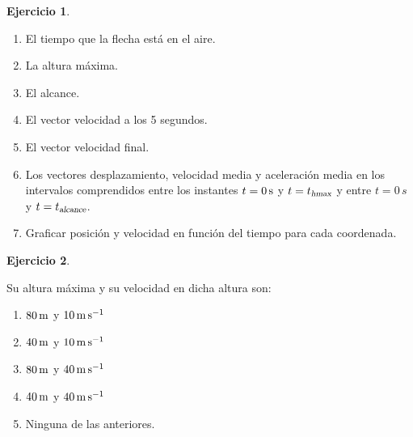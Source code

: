 \documentclass[a4paper,12pt,twoside]{book}
\newtheorem{ejercicio}{{Ejercicio}}[chapter]
\begin{document}
\begin{mdframed}[style=ejercicio-facil]
    \begin{ejercicio}
    \end{ejercicio}
    \begin{enumerate}
        \item El tiempo que la flecha está en el aire. 
        \item La altura máxima.
        \item El alcance.
        \item El vector velocidad a los 5 segundos.
        \item El vector velocidad final.
        \item Los vectores desplazamiento, velocidad media y aceleración media en los intervalos comprendidos entre los instantes $t=0 \, \si{\second}$ y $t = {{t}_\textsl{{hmax}}}$ y entre $t = 0 \, s$ y
        $t = {{t}_\textsl{{alcance}}}$.
        \item Graficar posición y velocidad en función del tiempo para cada coordenada. 
    \end{enumerate}
\end{mdframed}

\begin{mdframed}[style=ejercicio-facil]
    \begin{ejercicio}
    \end{ejercicio}
    Su altura máxima y su velocidad en dicha altura son:
    \begin{enumerate}
        \renewcommand{\theenumi}{\Alph{enumi}}   
        \item $80 \, \si{\metre}$ y $10 \, \si{\metre\per\second}$
        \item $40 \, \si{\metre}$ y $10 \, \si{\metre\per\second}$
        \item $80 \, \si{\metre}$ y $40 \, \si{\metre\per\second}$
        \item $40 \, \si{\metre}$ y $40 \, \si{\metre\per\second}$
        \item Ninguna de las anteriores.
    \end{enumerate}
\end{mdframed}
\end{document}
